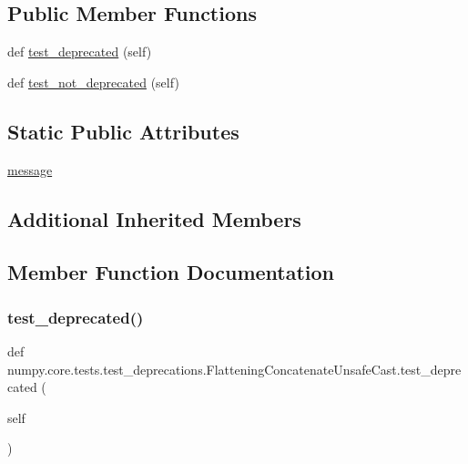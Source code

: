 \subsection*{Public Member Functions}
\begin{DoxyCompactItemize}
\item 
def \hyperlink{classnumpy_1_1core_1_1tests_1_1test__deprecations_1_1FlatteningConcatenateUnsafeCast_aadc084adb8abb049d06c83fe6ae5a80a}{test\+\_\+deprecated} (self)
\item 
def \hyperlink{classnumpy_1_1core_1_1tests_1_1test__deprecations_1_1FlatteningConcatenateUnsafeCast_a693f7a0bd6d78c80af0143b7545bcd72}{test\+\_\+not\+\_\+deprecated} (self)
\end{DoxyCompactItemize}
\subsection*{Static Public Attributes}
\begin{DoxyCompactItemize}
\item 
\hyperlink{classnumpy_1_1core_1_1tests_1_1test__deprecations_1_1FlatteningConcatenateUnsafeCast_a83fc0858e61fdfe04152dbf7cdc22da0}{message}
\end{DoxyCompactItemize}
\subsection*{Additional Inherited Members}


\subsection{Member Function Documentation}
\mbox{\label{classnumpy_1_1core_1_1tests_1_1test__deprecations_1_1FlatteningConcatenateUnsafeCast_aadc084adb8abb049d06c83fe6ae5a80a}} 
\subsubsection{\texorpdfstring{test\+\_\+deprecated()}{test\_deprecated()}}
{\footnotesize\ttfamily def numpy.\+core.\+tests.\+test\+\_\+deprecations.\+Flattening\+Concatenate\+Unsafe\+Cast.\+test\+\_\+deprecated (\begin{DoxyParamCaption}\item[{}]{self }\end{DoxyParamCaption})}

